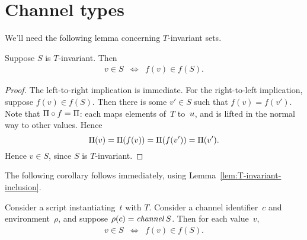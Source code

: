 
\section{Channel types}

We'll need the following lemma concerning $T$-invariant sets.
%
\begin{lemma}
\label{lem:T-invariant-inclusion}
Suppose $S$ is $T$-invariant.  Then 
%
\begin{eqnarray*}
v \in S & \iff & f(v) \in f(S).
\end{eqnarray*}
\end{lemma}


\begin{proof}
The left-to-right implication is immediate.  For the right-to-left
implication, suppose $f(v) \in f(S)$.  Then there is some $v' \in S$ such that
$f(v) = f(v')$.  Note that $\Pi \circ f = \Pi$: each maps elements
of~$T$ to~$u$, and is lifted in the normal way to other values.  Hence
\[
\Pi(v) = \Pi(f(v)) = \Pi(f(v')) = \Pi(v').
\]
Hence $v \in S$, since $S$ is $T$-invariant.
\end{proof}


The following corollary follows immediately, using
Lemma~\ref{lem:T-invariant-inclusion}.
%
\begin{corollary}
\label{cor:channel-types}
Consider a script instantiating~$t$ with $T$.  Consider a channel
identifier~$c$ and environment~$\rho$, and suppose $\rho(c) = \mathop{\it channel} S$.
Then for each value~$v$,
\begin{eqnarray*}
v \in S & \iff & f(v) \in f(S).
\end{eqnarray*}
\end{corollary}



